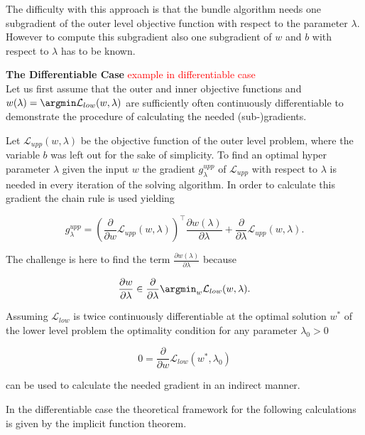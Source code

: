 The difficulty with this approach is that the bundle algorithm needs one subgradient of the outer level objective function with respect to the parameter \(\lambda\). However to compute this subgradient also one subgradient of \(w\) and \(b\) with respect to \(\lambda\) has to be known.

\textbf{The Differentiable Case}
\textcolor{red}{example in differentiable case}\\
Let us first assume that the outer and inner objective functions and \(w(\lambda)= \argmin \mathcal{L}_{low}(w,\lambda)\) are sufficiently often continuously differentiable to demonstrate the procedure of calculating the needed {(sub-)gradients}.

Let \(\mathcal{L}_{upp}(w,\lambda)\) be the objective function of the outer level problem, where the variable \(b\) was left out for the sake of simplicity.
To find an optimal hyper parameter \(\lambda\) given the input \(w\) the gradient \(g^{upp}_{\lambda}\) of \(\mathcal{L}_{upp}\) with respect to \(\lambda\) is needed in every iteration of the solving algorithm.
In order to calculate this gradient the chain rule is used yielding

\begin{equation*}
	g^{upp}_{\lambda} = \left(\frac{\partial}{\partial w}\mathcal{L}_{upp}(w,\lambda) \right)^{\top}\frac{\partial w(\lambda)}{\partial\lambda}+\frac{\partial}{\partial \lambda}\mathcal{L}_{upp}(w,\lambda).
\end{equation*}

The challenge is here to find the term \(\frac{\partial w(\lambda)}{\partial\lambda}\) because 

\[ \frac{\partial w}{\partial \lambda} \in \frac{\partial }{\partial \lambda} \argmin_{w} \mathcal{L}_{low}(w,\lambda). \]

Assuming \(\mathcal{L}_{low}\) is twice continuously differentiable at the  optimal solution \(w^*\) of the lower level problem the optimality condition for any parameter \(\lambda_0 > 0\)

\begin{equation}
	0 = \frac{\partial}{\partial w}\mathcal{L}_{low}(w^*,\lambda_0)
\label{opt_con}
\end{equation}


can be used to calculate the needed gradient in an indirect manner.

In the differentiable case the theoretical framework for the following calculations is given by the implicit function theorem.

